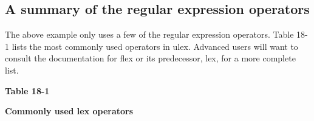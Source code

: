\subsection{A summary of the regular expression operators}

The above example only uses a few of the regular expression operators.
Table 18-1 lists the most commonly used operators in \textsf{ulex}.
Advanced users will want to consult the documentation for \textsf{flex}
or its predecessor, \textsf{lex}, for a more complete list.

\vspace{0.16in}

{\centering\sffamily\bfseries
Table 18-1
\par}

{\centering\sffamily\bfseries
Commonly used lex operators
\par}

